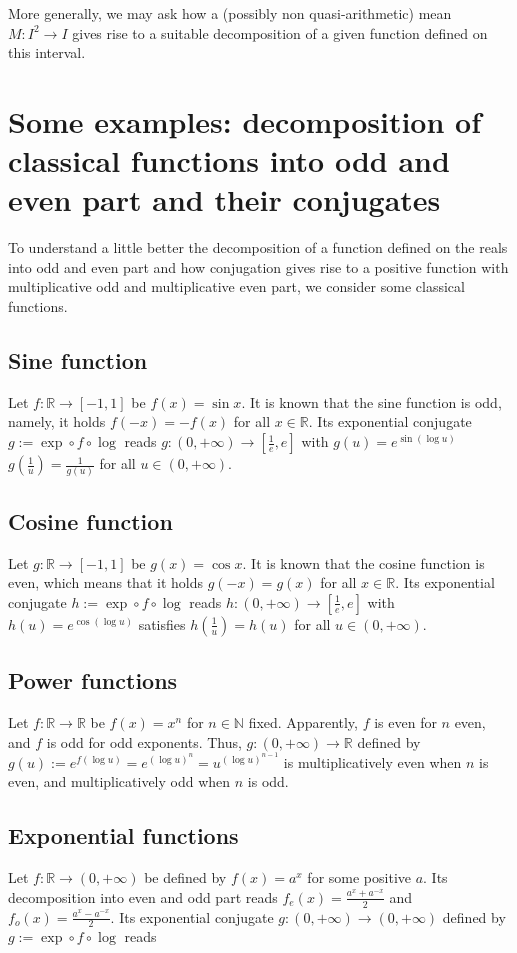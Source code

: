 \documentclass{amsart}
\theoremstyle{plain}
\numberwithin{equation}{section}
\newcommand{\R}{{\mathbb{R}}}
\newcommand{\N}{{\mathbb{N}}}
\begin{document}
More generally, we may ask how a (possibly non quasi-arithmetic) mean $M: I^2 \to I$
gives rise to a suitable decomposition of a given function defined on this interval.

\section{Some examples:  decomposition of classical functions into odd and even part and their conjugates }
To understand a little better the decomposition of a function defined on the reals
into odd and even part and how conjugation gives rise to a positive function 
with multiplicative odd and multiplicative even part, we consider some classical functions.

\subsection{Sine function}
Let $f: \R \to [-1, 1]$ be $f(x)=\sin{x}$.
It is known that the sine function is odd, namely, it holds
$f(-x)=-f(x)$ for all $x \in \R$.
Its exponential conjugate $g:=\exp \circ f \circ \log $ reads $g: (0, + \infty) \to [\frac{1}{e},  e]$ with $g(u)=e^{\sin{\left( \log{u}\right)}}$
$g(\frac{1}{u})=\frac{1}{g(u)}$ for all $u \in (0, + \infty)$.

\subsection{Cosine function}
Let $g: \R \to [-1, 1]$ be $g(x)=\cos{x}$.
It is known that the cosine function is even, which means that it holds
$g(-x)=g(x)$ for all $x \in \R$.
Its exponential conjugate $h:=\exp \circ f \circ \log $ reads $h: (0, + \infty) \to [\frac{1}{e},  e]$ with $h(u)=e^{\cos{\left( \log{u}\right)}}$
satisfies $h\left(\frac{1}{u}\right)=h(u)$ for all $u \in (0, + \infty)$.

\subsection{Power functions}
Let $f: \R \to \R$ be $f(x)=x^n$ for $n \in \N$ fixed. 
Apparently, $f$ is even for $n$ even, and $f$ is odd for odd exponents. 
Thus,
$g: (0, + \infty) \to \R$ defined by
$g(u):=e^{f(\log{u})}=e^{(\log{u})^n}=u^{(\log{u})^{n-1}}$
is multiplicatively even when \( n \) is even, and multiplicatively odd when \( n \) is odd.

\subsection{Exponential functions}
Let $f: \R \to (0,+\infty)$ be defined by $f(x)=a^x$ for some positive $a$.
Its decomposition into even and odd part reads
$f_e (x)=\frac{a^x +a^{-x}}{2}$
and
$f_o (x)=\frac{a^x -a^{-x}}{2}$. 
Its exponential conjugate $g: (0,+\infty) \to (0,+\infty)$ defined by $g:=\exp \circ f \circ \log$ reads
\end{document}
